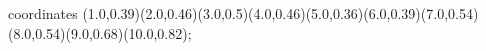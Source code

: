 					coordinates { (1.0,0.39)(2.0,0.46)(3.0,0.5)(4.0,0.46)(5.0,0.36)(6.0,0.39)(7.0,0.54)(8.0,0.54)(9.0,0.68)(10.0,0.82)};